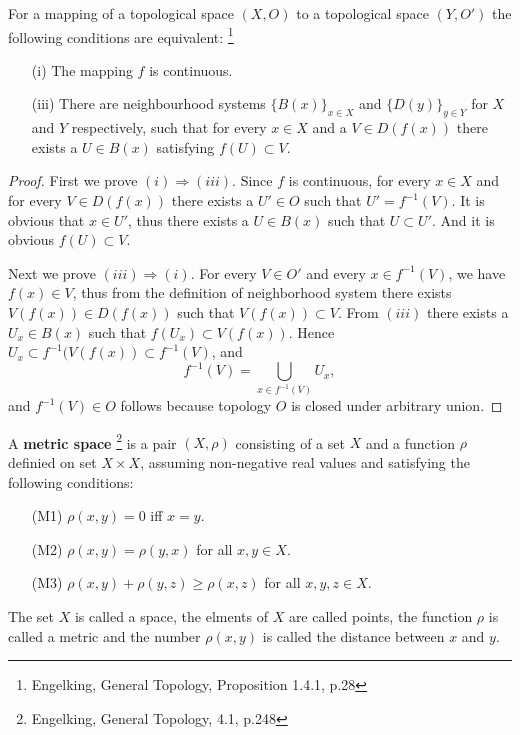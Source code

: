 \begin{proposition} \label{P:cont}
For a mapping of a topological space $(X,O)$ to a topological space $(Y,O')$ the
following conditions are equivalent:
  \footnote{Engelking, General Topology, Proposition 1.4.1, p.28}
\begin{enumerate}
  \item[(i)] The mapping $f$ is continuous.
  \item[(iii)] There are neighbourhood systems $\{B(x)\}_{x\in X}$ and 
     $\{D(y)\}_{y\in Y}$ for $X$ and $Y$ respectively, such that for every
     $x\in X$ and a $V\in D(f(x))$ there exists a $U\in B(x)$ satisfying
     $f(U)\subset V$.
\end{enumerate}
\end{proposition} 

\begin{proof}
First we prove $(i)\Rightarrow (iii)$. Since $f$ is continuous, for every 
$x\in X$ and for every $V\in D(f(x))$ there exists a $U'\in O$ such that 
$U'=f^{-1}(V)$. It is obvious that $x\in U'$, thus there exists a $U\in B(x)$
such that $U\subset U'$. And it is obvious $f(U)\subset V$.

Next we prove $(iii)\Rightarrow (i)$. For every $V\in O'$ and every 
$x\in f^{-1}(V)$, we have $f(x)\in V$, thus from the definition of neighborhood
system there exists $V(f(x))\in D(f(x))$ such that $V(f(x))\subset V$. 
From $(iii)$ there exists a $U_x\in B(x)$ such that $f(U_x)\subset V(f(x))$.
Hence $U_x\subset f^{-1}(V(f(x))\subset f^{-1}(V)$, and
\[
  f^{-1}(V)=\bigcup_{x\in f^{-1}(V)} U_x,
\]
and $f^{-1}(V)\in O$ follows because topology $O$ is closed under arbitrary 
union.
\end{proof}


    
    


\begin{definition} \label{D:metric}
A \textbf{metric space}
\footnote{Engelking, General Topology, 4.1, p.248}
is a pair $(X,\rho)$ consisting of a set $X$ and a function $\rho$
definied on set $X\times X$, assuming non-negative real values and satisfying
the following conditions:
\begin{enumerate}
  \item[(M1)] $\rho(x,y)=0$ iff $x=y$.
  \item[(M2)] $\rho(x,y)=\rho(y,x)$ for all $x,y\in X$.
  \item[(M3)] $\rho(x,y)+\rho(y,z)\ge \rho(x,z)$ for all $x,y,z\in X$.
\end{enumerate}
The set $X$ is called a space, the elments of $X$ are called points, the
function $\rho$ is called a metric and the number $\rho(x,y)$ is called the distance
between $x$ and $y$.
\end{definition}


